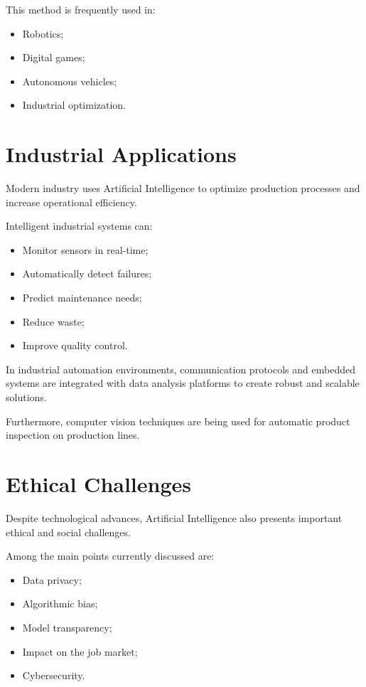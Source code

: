 \documentclass[11pt]{article}
\begin{document}
This method is frequently used in:

\begin{itemize}
    \item Robotics;
    \item Digital games;
    \item Autonomous vehicles;
    \item Industrial optimization.
\end{itemize} 

\section{Industrial Applications}

Modern industry uses Artificial Intelligence to optimize production processes and increase
operational efficiency.

Intelligent industrial systems can:

\begin{itemize}
    \item Monitor sensors in real-time;
    \item Automatically detect failures;
    \item Predict maintenance needs;
    \item Reduce waste;
    \item Improve quality control.
\end{itemize}

In industrial automation environments, communication protocols and embedded systems are
integrated with data analysis platforms to create robust and scalable solutions.
 
Furthermore, computer vision techniques are being used for automatic product inspection
on production lines.

\section{Ethical Challenges}

Despite technological advances, Artificial Intelligence also presents important ethical and
social challenges.

Among the main points currently discussed are:

\begin{itemize}
    \item Data privacy;
    \item Algorithmic bias;
    \item Model transparency;
    \item Impact on the job market;
    \item Cybersecurity.
\end{itemize}
\end{document}
